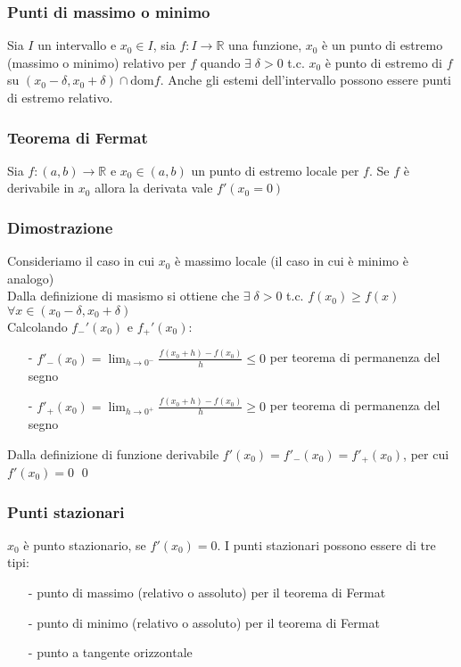 \documentclass[a4paper]{article}
\newcommand\dom{\text{dom}}
\begin{document}
\subsubsection*{Punti di massimo o minimo}
Sia \(I\) un intervallo e \(x_0 \in I\), sia \(f:I \to \mathbb{R}\) una funzione, \(x_0\) è un punto di estremo (massimo o minimo) relativo
per \(f\) quando \(\exists \; \delta > 0\) t.c. \(x_0\) è punto di estremo di \(f\) su \(\left(x_0 - \delta, x_0 + \delta\right) \cap \dom f\).
Anche gli estemi dell'intervallo possono essere punti di estremo relativo.

\subsubsection*{Teorema di Fermat}
Sia \(f:\left(a, b\right) \to \mathbb{R}\) e \(x_0 \in \left(a, b\right)\) un punto di estremo locale per \(f\). Se \(f\) è derivabile in \(x_0\)
allora la derivata vale \(f'(x_0 = 0)\)

\subsubsection*{Dimostrazione}
Consideriamo il caso in cui \(x_0\) è massimo locale (il caso in cui è minimo è analogo) \\
Dalla definizione di masismo si ottiene che \(\exists \; \delta > 0\) t.c. \(f(x_0) \geq f(x)\) \(\forall x \in \left(x_0 - \delta, x_0 + \delta\right)\) \\
Calcolando \(f_-'(x_0)\) e \(f_+'(x_0)\):
\begin{itemize} [topsep=3pt, itemsep=0pt]
	\item[-] \(\displaystyle f'_-(x_0) = \lim_{h \to 0^-} \frac{f(x_0 + h) - f(x_0)}{h} \leq 0\) per teorema di permanenza del segno
	\item[-] \(\displaystyle f'_+(x_0) = \lim_{h \to 0^+} \frac{f(x_0 + h) - f(x_0)}{h} \geq 0\) per teorema di permanenza del segno
\end{itemize}
Dalla definizione di funzione derivabile \(f'(x_0) = f'_-(x_0) = f'_+(x_0)\), per cui \(f'(x_0) = 0\)
\qed

\subsubsection*{Punti stazionari}
\(x_0\) è punto stazionario, se \(f'(x_0) = 0\). I punti stazionari possono essere di tre tipi:
\begin{itemize} [topsep=3pt, itemsep=0pt]
	\item[-] punto di massimo (relativo o assoluto) per il teorema di Fermat
	\item[-] punto di minimo (relativo o assoluto) per il teorema di Fermat
	\item[-] punto a tangente orizzontale
\end{itemize}
\end{document}
